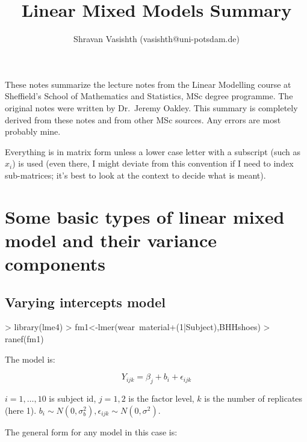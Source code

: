 \documentclass[12pt]{amsart}
\title{Linear Mixed Models Summary}
\author{Shravan Vasishth (vasishth@uni-potsdam.de)}
\begin{document}

\maketitle



These notes summarize the lecture notes from the Linear Modelling course at Sheffield's School of Mathematics and Statistics, MSc degree programme. The original notes were written by Dr.\ Jeremy Oakley. This summary is completely derived from these notes and from other MSc sources. Any errors are most probably mine.

Everything is in matrix form unless a lower case letter with a subscript (such as $x_i$) is used (even there, I might deviate from this convention if I need to index sub-matrices; it's best to look at the context to decide what is meant).

\section{Some basic types of linear mixed model and their variance components}

\subsection{Varying intercepts model}

\begin{Schunk}
\begin{Sinput}
> library(lme4)
> fm1<-lmer(wear~material+(1|Subject),BHHshoes)
> ranef(fm1)
\end{Sinput}
\end{Schunk}

The model is:

\begin{equation}
Y_{ijk} = \beta_j + b_{i}+\epsilon_{ijk}
\end{equation}

\noindent
$i=1,\dots,10$ is subject id, $j=1,2$ is the factor level, $k$ is the number of replicates (here 1).
$b_i \sim N(0,\sigma_b^2), \epsilon_{ijk}\sim N(0,\sigma^2)$.

The general form for any model in this case is:
\end{document}
